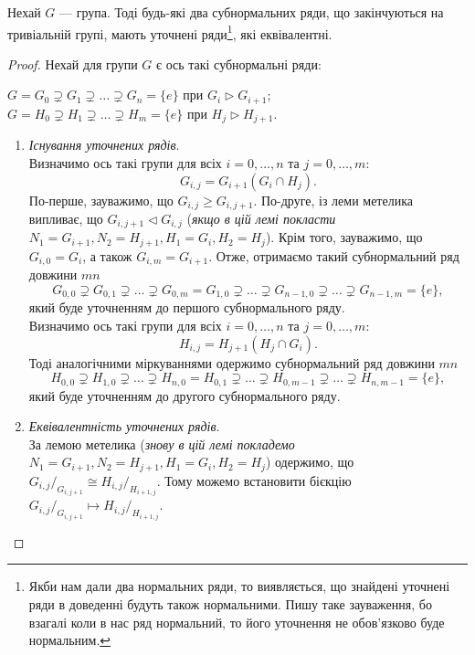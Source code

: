 \documentclass{math_library}
\begin{document}
\begin{theorem}
Нехай $G$ --- група. Тоді будь-які два субнормальних ряди, що закінчуються на тривіальній групі, мають уточнені ряди\footnote{Якби нам дали два нормальних ряди, то виявляється, що знайдені уточнені ряди в доведенні будуть також нормальними. Пишу таке зауваження, бо взагалі коли в нас ряд нормальний, то його уточнення не обов'язково буде нормальним.}, які еквівалентні.
\end{theorem}

\begin{proof}
Нехай для групи $G$ є ось такі субнормальні ряди:
\begin{center}
$G = G_0 \supsetneq G_1 \supsetneq \dots \supsetneq G_n = \{e\}$ при $G_{i} \triangleright G_{i+1}$; \\
$G = H_0 \supsetneq H_1 \supsetneq \dots \supsetneq H_m = \{e\}$ при $H_j \triangleright H_{j+1}$.
\end{center}
\begin{enumerate}[wide=0pt, label={\Roman*.}]
\item \textit{Існування уточнених рядів}.\\
Визначимо ось такі групи для всіх $i = 0,\dots,n$ та $j = 0,\dots,m$:
\[
G_{i,j} = G_{i+1} (G_i \cap H_j).
\]
По-перше, зауважимо, що $G_{i,j} \geq G_{i,j+1}$. По-друге, із леми метелика випливає, що $G_{i,j+1} \triangleleft G_{i,j}$ (\textit{якщо в цій лемі покласти $N_1 = G_{i+1}, N_2 = H_{j+1}, H_1 = G_i, H_2 = H_{j}$}). Крім того, зауважимо, що $G_{i,0} = G_i$, а також $G_{i,m} = G_{i+1}$. Отже, отримаємо такий субнормальний ряд довжини $mn$
\[
G_{0,0} \supsetneq G_{0,1} \supsetneq \dots \supsetneq G_{0,m} = G_{1,0} \supsetneq \dots \supsetneq G_{n-1,0} \supsetneq \dots \supsetneq G_{n-1,m} = \{e\},
\]
який буде уточненням до першого субнормального ряду.
\bigskip \\
Визначимо ось такі групи для всіх $i = 0,\dots,n$ та $j = 0,\dots,m$:
\[
H_{i,j} = H_{j+1} (H_j \cap G_i).
\]
Тоді аналогічними міркуваннями одержимо субнормальний ряд довжини  $mn$
\[
H_{0,0} \supsetneq H_{1,0} \supsetneq \dots \supsetneq H_{n,0} = H_{0,1} \supsetneq \dots \supsetneq H_{0,m-1} \supsetneq \dots \supsetneq H_{n,m-1} = \{e\},
\]
який буде уточненням до другого субнормального ряду.

\item \textit{Еквівалентність уточнених рядів}.\\
За лемою метелика (\textit{знову в цій лемі покладемо $N_1 = G_{i+1}, N_2 = H_{j+1}, H_1 = G_i, H_2 = H_{j}$}) одержимо, що $G_{i,j}/_{G_{i,j+1}} \cong H_{i,j}/_{H_{i+1,j}}$. Тому можемо встановити бієкцію $G_{i,j}/_{G_{i,j+1}} \mapsto H_{i,j}/_{H_{i+1,j}}$. \qedhere
\end{enumerate}
\end{proof}
\end{document}
